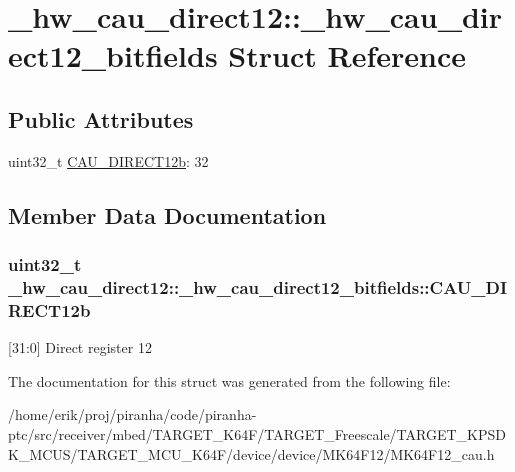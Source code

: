 \hypertarget{struct__hw__cau__direct12_1_1__hw__cau__direct12__bitfields}{}\section{\+\_\+hw\+\_\+cau\+\_\+direct12\+:\+:\+\_\+hw\+\_\+cau\+\_\+direct12\+\_\+bitfields Struct Reference}
\label{struct__hw__cau__direct12_1_1__hw__cau__direct12__bitfields}
\subsection*{Public Attributes}
\begin{DoxyCompactItemize}
\item 
uint32\+\_\+t \hyperlink{struct__hw__cau__direct12_1_1__hw__cau__direct12__bitfields_ac3c94f6376c8c90f35e44695512898b6}{C\+A\+U\+\_\+\+D\+I\+R\+E\+C\+T12b}\+: 32
\end{DoxyCompactItemize}


\subsection{Member Data Documentation}
\subsubsection[{\texorpdfstring{C\+A\+U\+\_\+\+D\+I\+R\+E\+C\+T12b}{CAU_DIRECT12b}}]{\setlength{\rightskip}{0pt plus 5cm}uint32\+\_\+t \+\_\+hw\+\_\+cau\+\_\+direct12\+::\+\_\+hw\+\_\+cau\+\_\+direct12\+\_\+bitfields\+::\+C\+A\+U\+\_\+\+D\+I\+R\+E\+C\+T12b}\hypertarget{struct__hw__cau__direct12_1_1__hw__cau__direct12__bitfields_ac3c94f6376c8c90f35e44695512898b6}{}\label{struct__hw__cau__direct12_1_1__hw__cau__direct12__bitfields_ac3c94f6376c8c90f35e44695512898b6}
\mbox{[}31\+:0\mbox{]} Direct register 12 

The documentation for this struct was generated from the following file\+:\begin{DoxyCompactItemize}
\item 
/home/erik/proj/piranha/code/piranha-\/ptc/src/receiver/mbed/\+T\+A\+R\+G\+E\+T\+\_\+\+K64\+F/\+T\+A\+R\+G\+E\+T\+\_\+\+Freescale/\+T\+A\+R\+G\+E\+T\+\_\+\+K\+P\+S\+D\+K\+\_\+\+M\+C\+U\+S/\+T\+A\+R\+G\+E\+T\+\_\+\+M\+C\+U\+\_\+\+K64\+F/device/device/\+M\+K64\+F12/M\+K64\+F12\+\_\+cau.\+h\end{DoxyCompactItemize}
